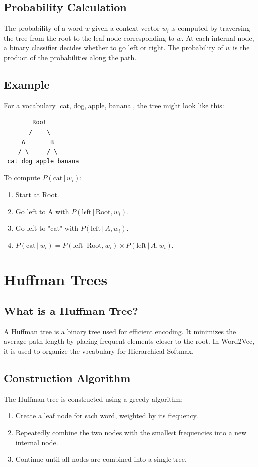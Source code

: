 \begin{notechapter}
\subsection{Probability Calculation}
The probability of a word \( w \) given a context vector
\( w_i \) is computed by traversing the tree from the root
to the leaf node corresponding to \( w \). At each internal
node, a binary classifier decides whether to go left or
right. The probability of \( w \) is the product of the
probabilities along the path.

\subsection{Example}
For a vocabulary [cat, dog, apple, banana], the tree might
look like this:

\begin{verbatim}
        Root
       /    \
     A       B
    / \     / \
 cat dog apple banana
\end{verbatim}

To compute \( P(\text{cat} \,|\, w_i) \):
\begin{enumerate}
    \item Start at Root.
    \item Go left to A with \( P(\text{left} \,|\, \text{Root}, w_i) \).
    \item Go left to "cat" with \( P(\text{left} \,|\, A, w_i) \).
    \item \( P(\text{cat} \,|\, w_i) = P(\text{left} \,|\, \text{Root}, w_i)
          \times P(\text{left} \,|\, A, w_i) \).
\end{enumerate}

\section{Huffman Trees}
\subsection{What is a Huffman Tree?}
A Huffman tree is a binary tree used for efficient encoding.
It minimizes the average path length by placing frequent
elements closer to the root. In Word2Vec, it is used to
organize the vocabulary for Hierarchical Softmax.

\subsection{Construction Algorithm}
The Huffman tree is constructed using a greedy algorithm:
\begin{enumerate}
    \item Create a leaf node for each word, weighted by its frequency.
    \item Repeatedly combine the two nodes with the smallest
          frequencies into a new internal node.
    \item Continue until all nodes are combined into a single tree.
\end{enumerate}


\end{notechapter}
